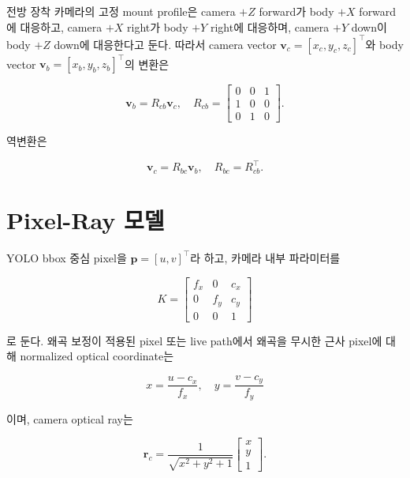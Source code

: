 \documentclass[10pt,conference]{IEEEtran}
\newcommand{\vect}[1]{\bm{#1}}
\begin{document}
전방 장착 카메라의 고정 mount profile은 camera $+Z$ forward가 body $+X$ forward에 대응하고, camera $+X$ right가 body $+Y$ right에 대응하며, camera $+Y$ down이 body $+Z$ down에 대응한다고 둔다.
따라서 camera vector $\vect{v}_c=[x_c,y_c,z_c]^\top$와 body vector $\vect{v}_b=[x_b,y_b,z_b]^\top$의 변환은

\begin{equation}
\vect{v}_b = R_{cb}\vect{v}_c,
\quad
R_{cb} =
\begin{bmatrix}
0 & 0 & 1 \\
1 & 0 & 0 \\
0 & 1 & 0
\end{bmatrix}.
\label{eq:camera_to_body}
\end{equation}

역변환은

\begin{equation}
\vect{v}_c = R_{bc}\vect{v}_b,
\quad
R_{bc}=R_{cb}^{\top}.
\label{eq:body_to_camera}
\end{equation}

\section{Pixel-Ray 모델}

YOLO bbox 중심 pixel을 $\vect{p}=[u,v]^\top$라 하고, 카메라 내부 파라미터를

\begin{equation}
K =
\begin{bmatrix}
f_x & 0 & c_x \\
0 & f_y & c_y \\
0 & 0 & 1
\end{bmatrix}
\end{equation}

로 둔다.
왜곡 보정이 적용된 pixel 또는 live path에서 왜곡을 무시한 근사 pixel에 대해 normalized optical coordinate는

\begin{equation}
x = \frac{u-c_x}{f_x},
\quad
y = \frac{v-c_y}{f_y}
\end{equation}

이며, camera optical ray는

\begin{equation}
\vect{r}_c =
\frac{1}{\sqrt{x^2+y^2+1}}
\begin{bmatrix}
x \\ y \\ 1
\end{bmatrix}.
\label{eq:pixel_ray}
\end{equation}
\end{document}
